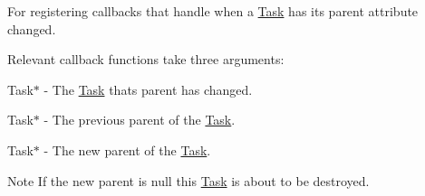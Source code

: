 For registering callbacks that handle when a \hyperlink{classsigma_1_1core_1_1tasks_1_1_task}{Task} has its parent attribute changed. 

Relevant callback functions take three arguments\-:
\begin{DoxyItemize}
\item {\ttfamily Task$\ast$} -\/ The \hyperlink{classsigma_1_1core_1_1tasks_1_1_task}{Task} thats parent has changed.
\item {\ttfamily Task$\ast$} -\/ The previous parent of the \hyperlink{classsigma_1_1core_1_1tasks_1_1_task}{Task}.
\item {\ttfamily Task$\ast$} -\/ The new parent of the \hyperlink{classsigma_1_1core_1_1tasks_1_1_task}{Task}.
\end{DoxyItemize}

\begin{DoxyNote}{Note}
If the new parent is null this \hyperlink{classsigma_1_1core_1_1tasks_1_1_task}{Task} is about to be destroyed. 
\end{DoxyNote}
